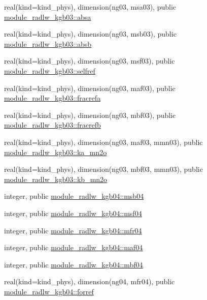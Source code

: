 \begin{DoxyCompactItemize}
\item 
real(kind=kind\+\_\+phys), dimension(ng03, msa03), public \hyperlink{group__module__radlw__main_gac65fd4afedbd4bfa2c87c5e4f060a1d4}{module\+\_\+radlw\+\_\+kgb03\+::absa}
\item 
real(kind=kind\+\_\+phys), dimension(ng03, msb03), public \hyperlink{group__module__radlw__main_gaa84ba66e0a3cc018b03bd13c9c21e133}{module\+\_\+radlw\+\_\+kgb03\+::absb}
\item 
real(kind=kind\+\_\+phys), dimension(ng03, msf03), public \hyperlink{group__module__radlw__main_ga6bb40d898660e6dfc056d3efe1d0c544}{module\+\_\+radlw\+\_\+kgb03\+::selfref}
\item 
real(kind=kind\+\_\+phys), dimension(ng03, maf03), public \hyperlink{group__module__radlw__main_ga26e901a002e789933c5c9b622f3a0932}{module\+\_\+radlw\+\_\+kgb03\+::fracrefa}
\item 
real(kind=kind\+\_\+phys), dimension(ng03, mbf03), public \hyperlink{group__module__radlw__main_gaf1d33a7362e73bf40ef592bc9863b612}{module\+\_\+radlw\+\_\+kgb03\+::fracrefb}
\item 
real(kind=kind\+\_\+phys), dimension(ng03, maf03, mmn03), public \hyperlink{group__module__radlw__main_gaeeba4e0a8fc97c557e1127b4d5d1bd94}{module\+\_\+radlw\+\_\+kgb03\+::ka\+\_\+mn2o}
\item 
real(kind=kind\+\_\+phys), dimension(ng03, mbf03, mmn03), public \hyperlink{group__module__radlw__main_gaa2442e663e83b222648a86a34cd6631c}{module\+\_\+radlw\+\_\+kgb03\+::kb\+\_\+mn2o}
\item 
integer, public \hyperlink{group__module__radlw__main_gab9ce0111a156f7b80f2adaa9f3e84a32}{module\+\_\+radlw\+\_\+kgb04\+::msb04}
\item 
integer, public \hyperlink{group__module__radlw__main_ga4b38dd1165aca80e19697df7ae74a27a}{module\+\_\+radlw\+\_\+kgb04\+::msf04}
\item 
integer, public \hyperlink{group__module__radlw__main_gab6ae25b4a793bf78ccd504685d639039}{module\+\_\+radlw\+\_\+kgb04\+::mfr04}
\item 
integer, public \hyperlink{group__module__radlw__main_ga60ff35def4e526c7d9cf3ec88bdd4485}{module\+\_\+radlw\+\_\+kgb04\+::maf04}
\item 
integer, public \hyperlink{group__module__radlw__main_ga768f4447809fb11206dce383a121d595}{module\+\_\+radlw\+\_\+kgb04\+::mbf04}
\item 
real(kind=kind\+\_\+phys), dimension(ng04, mfr04), public \hyperlink{group__module__radlw__main_ga816fd065291a92c13d026d38a708479b}{module\+\_\+radlw\+\_\+kgb04\+::forref}

\end{DoxyCompactItemize}
